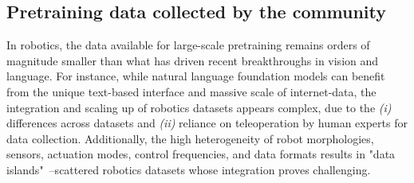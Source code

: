 





\subsection{Pretraining data collected by the community}

In robotics, the data available for large-scale pretraining remains orders of magnitude smaller than what has driven recent breakthroughs in vision and language. 
For instance, while natural language foundation models can benefit from the unique text-based interface and massive scale of internet-data, the integration and scaling up of robotics datasets appears complex, due to the \emph{(i)} differences across datasets and \emph{(ii)} reliance on teleoperation by human experts for data collection.
Additionally, the high heterogeneity of robot morphologies, sensors, actuation modes, control frequencies, and data formats results in "data islands"~\cite{bjorck2025gr00t}--scattered robotics datasets whose integration proves challenging.

